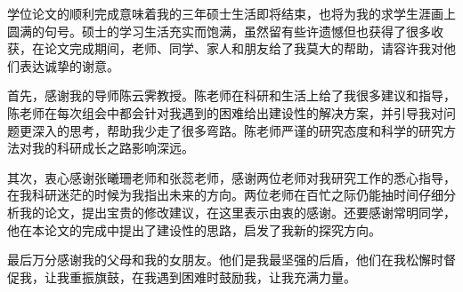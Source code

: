 
\begin{acknowledgements}

学位论文的顺利完成意味着我的三年硕士生活即将结束，也将为我的求学生涯画上圆满的句号。硕士的学习生活充实而饱满，虽然留有些许遗憾但也获得了很多收获，在论文完成期间，老师、同学、家人和朋友给了我莫大的帮助，请容许我对他们表达诚挚的谢意。

首先，感谢我的导师陈云霁教授。陈老师在科研和生活上给了我很多建议和指导，陈老师在每次组会中都会针对我遇到的困难给出建设性的解决方案，并引导我对问题更深入的思考，帮助我少走了很多弯路。陈老师严谨的研究态度和科学的研究方法对我的科研成长之路影响深远。

其次，衷心感谢张曦珊老师和张蕊老师，感谢两位老师对我研究工作的悉心指导，在我科研迷茫的时候为我指出未来的方向。两位老师在百忙之际仍能抽时间仔细分析我的论文，提出宝贵的修改建议，在这里表示由衷的感谢。还要感谢常明同学，他在本论文的完成中提出了建设性的思路，启发了我新的探究方向。

最后万分感谢我的父母和我的女朋友。他们是我最坚强的后盾，他们在我松懈时督促我，让我重振旗鼓，在我遇到困难时鼓励我，让我充满力量。

\end{acknowledgements}
